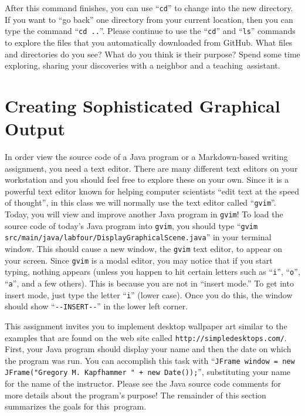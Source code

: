 \documentclass[11pt]{article}
\newcommand{\command}[1]{``\lstinline{#1}''}
\newcommand{\program}[1]{\lstinline{#1}}
\newcommand{\url}[1]{\lstinline{#1}}
\newcommand{\step}[1]{``{#1}''}
\begin{document}
After this command finishes, you can use \command{cd} to change into the new directory. If you want to \step{go back}
one directory from your current location, then you can type the command \command{cd ..}. Please continue to use the
\command{cd} and \command{ls} commands to explore the files that you automatically downloaded from GitHub. What files
and directories do you see? What do you think is their purpose? Spend some time exploring, sharing your discoveries with
a neighbor and a \mbox{teaching assistant}.

\section*{Creating Sophisticated Graphical Output}

In order view the source code of a Java program or a Markdown-based writing assignment, you need a text editor. There
are many different text editors on your workstation and you should feel free to explore these on your own. Since it is a
powerful text editor known for helping computer scientists ``edit text at the speed of thought'', in this class we will
normally use the text editor called \command{gvim}. Today, you will view and improve another Java program in {\tt gvim}!
To load the source code of today's Java program into \program{gvim}, you should type \command{gvim
src/main/java/labfour/DisplayGraphicalScene.java} in your terminal window. This should cause a new window, the \program{gvim}
text editor, to appear on your screen. Since \program{gvim} is a modal editor, you may notice that if you start typing,
nothing appears (unless you happen to hit certain letters such as \command{i}, \command{o}, \command{a}, and a few
others). This is because you are not in ``insert mode.'' To get into insert mode, just type the letter \command{i}
(lower case). Once you do this, the window should show \command{--INSERT--} in the lower left corner.

This assignment invites you to implement desktop wallpaper art similar to the examples that are found on the web site
called \url{http://simpledesktops.com/}. First, your Java program should display your name and then the date on which
the program was run. You can accomplish this task with \command{JFrame window = new JFrame("Gregory M. Kapfhammer " +
new Date());}, substituting your name for the name of the instructor. Please see the Java source code comments for more
details about the program's purpose! The remainder of this section summarizes the goals for \mbox{this program}.
\end{document}
